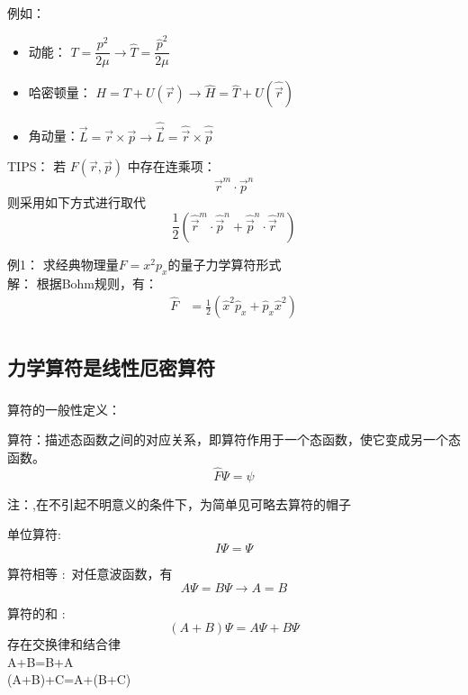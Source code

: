 \begin{frame}    
    \begin{exampleblock}{例如：}
        \begin{itemize}
            \item  动能： $ T=\dfrac{p^2}{2\mu} \to \hat{T}= \dfrac{\hat{p}^2}{2\mu} $
            \item  哈密顿量： $ H=T+U(\vec{r} ) \to \hat{H}= \hat{T}+ U(\hat{\vec{r}})$
            \item  角动量：$ \vec{L}=\vec{r}\times\vec{p} \to \hat{\vec{L}}=\hat{\vec{r}}\times \hat{\vec{p}}$
        \end{itemize}
    \end{exampleblock}  
    \alert{TIPS：} 若 $F(\vec{r},\vec{p})$ 中存在连乘项： 
    \[\vec{r}^m\cdot\vec{p}^n\] 
    则采用如下方式进行取代
    \[\frac{1}{2}(\hat{\vec{r}}^m\cdot\hat{\vec{p}}^n+\hat{\vec{p}}^n\cdot\hat{\vec{r}}^m)\]
\end{frame} 

\begin{frame} 
    \alert{例1：} 求经典物理量$F=x^2p_x$的量子力学算符形式 \\ 
    \alert{解：} 根据Bohm规则，有：
    \[\begin{aligned}
        \hat{F}&=\frac{1}{2} (\hat{x}^2 \hat{p}_x + \hat{p}_x \hat{x}^2 ) \\
    \end{aligned}\]   
\end{frame}     

\subsection{力学算符是线性厄密算符}

\begin{frame} 
    \frametitle{}
    算符的一般性定义：
    \begin{definition}
        算符：描述态函数之间的对应关系，即算符作用于一个态函数，使它变成另一个态函数。
        $$ \hat{F} \Psi=\psi$$
    \end{definition}
    注：,在不引起不明意义的条件下，为简单见可略去算符的帽子
    \begin{definition}
        单位算符:
        $$ I\Psi=\Psi $$
    \end{definition}
\end{frame} 

\begin{frame}
    \begin{definition}
        算符相等 : 对任意波函数，有
        $$ A\Psi=B\Psi \to A=B $$
    \end{definition}
    \begin{definition}
        算符的和 : 
        $$ (A+B)\Psi=A\Psi+B\Psi $$
        存在交换律和结合律\\
        A+B=B+A\\
        (A+B)+C=A+(B+C)
    \end{definition}
\end{frame} 


